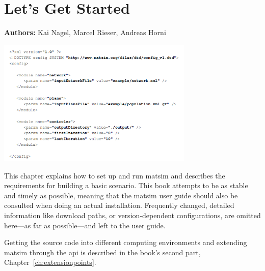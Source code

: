 \chapter{Let's Get Started}
\label{ch:lgstarted}
\hfill \textbf{Authors:} Kai Nagel, Marcel Rieser, Andreas Horni

\begin{center} \includegraphics[width=0.7\textwidth, angle=0]{using/figures/config.png} \end{center}


This chapter explains how to set up and run \gls{matsim} and describes the requirements for building a basic \gls{scenario}. This book attempts to be as stable and timely as possible, meaning that the \gls{matsim} user guide \citep[][]{MATSim_Userguide_2015}  should also be consulted when doing an actual installation. Frequently changed, detailed information like download paths, or version-dependent configurations, are omitted here---as far as possible---and left to the user guide. 

Getting the source code into different computing environments and extending \gls{matsim} through the \gls{api} is described in the book's second part, Chapter~\ref{ch:extensionpoints}.


